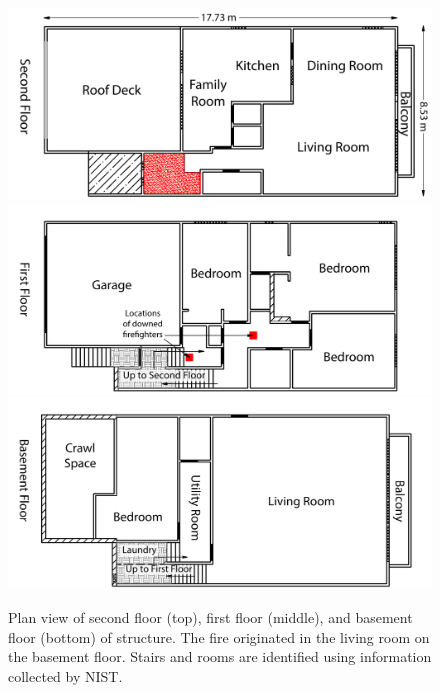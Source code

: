 \documentclass[12pt,oneside]{book}
\begin{document}
\begin{figure}[!ht]
\includegraphics[width=5.0in]{../Figures/Plan_Second_Floor}
\includegraphics[width=5.0in]{../Figures/Plan_First_Floor}
\includegraphics[width=5.0in]{../Figures/Plan_Basement_Floor}
\caption[Plan view of second floor (top), first floor (middle), and basement floor (bottom) of structure.]{Plan view of second floor (top), first floor (middle), and basement floor (bottom) of structure. The fire originated in the living room on the basement floor. Stairs and rooms are identified using information collected by NIST.}
\label{fig:floor_plan}
\end{figure}
\end{document}

